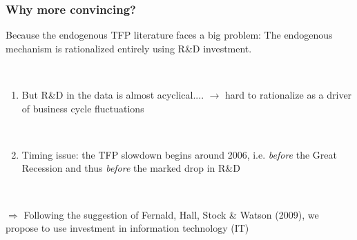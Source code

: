 \documentclass{beamer}
\begin{document}
\begin{frame}
	\frametitle{Why more convincing?}
	\label{convincing}
	
	Because the endogenous TFP literature faces a big problem: The endogenous mechanism is rationalized entirely using R\&D investment. 
	
	\
	
\begin{enumerate}
\item  But R\&D in the data is almost acyclical.... $\rightarrow$ hard to rationalize as a driver of business cycle fluctuations %


\

\item Timing issue: the TFP slowdown begins around 2006, i.e. \emph{before} the Great Recession and thus \emph{before} the marked drop in R\&D  %
\hyperlink{timing}{}

\end{enumerate}

\

$\Rightarrow$ Following the suggestion of Fernald, Hall, Stock \& Watson (2009), we propose to use investment in information technology (IT)  %
\hyperlink{it_investment}{}

	
	
\end{frame}
\end{document}
